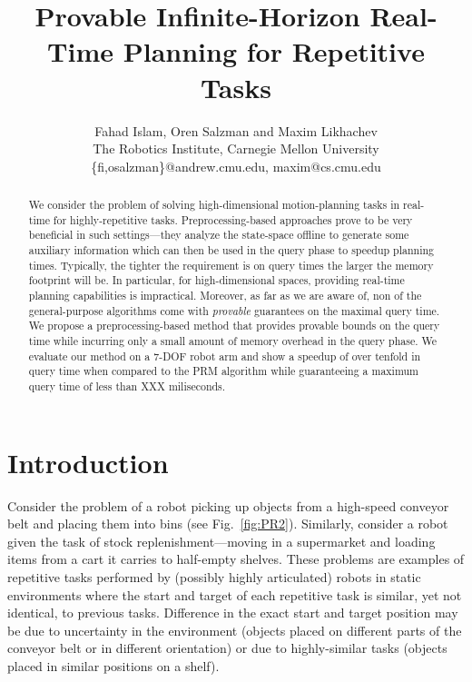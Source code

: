 \documentclass[letterpaper, 10 pt, conference]{ieeeconf}  %
\title{\LARGE \bf
Provable Infinite-Horizon Real-Time Planning for Repetitive Tasks
}
\author{
Fahad Islam,
Oren Salzman {\normalfont and}
Maxim Likhachev
\\
The Robotics Institute, Carnegie Mellon University\\
%
\{fi,osalzman\}@andrew.cmu.edu,
maxim@cs.cmu.edu
}
\begin{document}
\maketitle
\thispagestyle{empty}
\pagestyle{empty}


\begin{abstract}

We consider the problem of solving high-dimensional motion-planning tasks in real-time for highly-repetitive tasks. 
Preprocessing-based approaches prove to be very beneficial in such settings---they analyze the state-space offline to generate some auxiliary information which can then be used in the query phase to speedup planning times. 
%
Typically, the tighter the requirement is on query times the larger the memory footprint will be. In particular, for high-dimensional spaces, providing real-time planning capabilities is impractical.
Moreover, as far as we are aware of, non of the general-purpose algorithms come with \emph{provable} guarantees on the maximal query time.
We propose a preprocessing-based method that provides provable bounds on the query time while incurring only a small amount of memory overhead in the query phase. We evaluate our method on a 7-DOF robot arm and show a speedup of over tenfold in query time when compared to the \textsf{PRM} algorithm while guaranteeing a maximum query time of less than {\color{blue} XXX} miliseconds.

\end{abstract}

\section{Introduction}

Consider the problem of a robot picking up objects from a high-speed conveyor belt and placing them into bins (see Fig.~\ref{fig:PR2}).
Similarly, consider a robot given the task of stock replenishment---moving in a supermarket and loading items from a cart it carries to half-empty shelves.
These problems are examples of repetitive tasks performed by (possibly highly articulated) robots in static environments where the start and target of each repetitive task is similar, yet not identical, to previous tasks.
Difference in the exact start and target position may be due to uncertainty in the environment (objects placed on different parts of the conveyor belt or in different orientation) or due to highly-similar tasks (objects placed in similar positions on a shelf).
\end{document}
